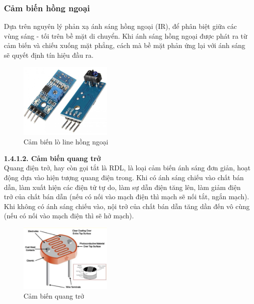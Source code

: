         \subsubsection{Cảm biến hồng ngoại}
            \hspace*{0.6cm}Dựa trên nguyên lý phản xạ ánh sáng hồng ngoại (IR), để phân biệt giữa các vùng sáng - tối
            trên bề mặt di chuyển. Khi ánh sáng hồng ngoại được phát ra từ cảm biến và chiếu xuống mặt phẳng, cách mà bề mặt phản ứng lại với ánh sáng sẽ quyết định tín hiệu đầu ra.
            \begin{figure}[H]
                \centering
                \includegraphics[width=0.4\textwidth]{pictures/chapter1/chapter1_pic17_IR.png}
                \caption{Cảm biến lò line hồng ngoại}
                \label{chap1_pic17}
            \end{figure}
            \textbf{1.4.1.2. Cảm biến quang trở}\\
            \hspace*{0.6cm}Quang điện trở, hay còn gọi tắt là RDL, là loại cảm biến ánh sáng đơn giản, hoạt động
                dựa vào hiện tượng quang điện trong. \newline
            \hspace*{0.6cm} Khi có ánh sáng chiếu vào chất bán dẫn, làm xuất hiện các điện tử tự do, làm sự
                dẫn điện tăng lên, làm giảm điện trở của chất bán dẫn (nếu có nối vào mạch điện thì
                mạch sẽ nối tắt, ngắn mạch). Khi không có ánh sáng chiếu vào, nội trở của chất bán dẫn
                tăng dần đến vô cùng (nếu có nối vào mạch điện thì sẽ hở mạch).
            \begin{figure}[H]
                \centering
                \includegraphics[width=0.4\textwidth]{pictures/chapter1/chapter1_pic16a_photoresistor.png}
                \caption{Cảm biến quang trở}
                \label{chap1_pic16}
            \end{figure}     

